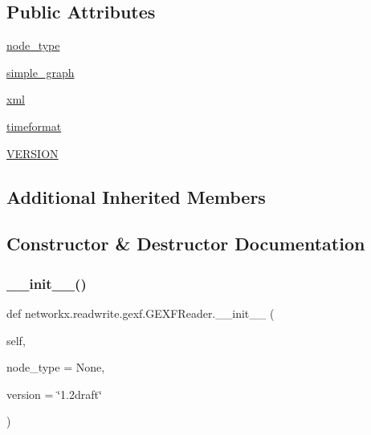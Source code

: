 \subsection*{Public Attributes}
\begin{DoxyCompactItemize}
\item 
\hyperlink{classnetworkx_1_1readwrite_1_1gexf_1_1GEXFReader_ab022efcb044daa1f42b2615cf23d138d}{node\+\_\+type}
\item 
\hyperlink{classnetworkx_1_1readwrite_1_1gexf_1_1GEXFReader_a7c01dd959645523de371d648253c10a1}{simple\+\_\+graph}
\item 
\hyperlink{classnetworkx_1_1readwrite_1_1gexf_1_1GEXFReader_af0364bdce16a7a6b7b7a99ee8fc10c1d}{xml}
\item 
\hyperlink{classnetworkx_1_1readwrite_1_1gexf_1_1GEXFReader_a2cc801b9e5e8dfa61e588269109c3c14}{timeformat}
\item 
\hyperlink{classnetworkx_1_1readwrite_1_1gexf_1_1GEXFReader_af739ebe81cb931658234506dce12d423}{V\+E\+R\+S\+I\+ON}
\end{DoxyCompactItemize}
\subsection*{Additional Inherited Members}


\subsection{Constructor \& Destructor Documentation}
\mbox{\label{classnetworkx_1_1readwrite_1_1gexf_1_1GEXFReader_ad35842c57fecd6a6ea233500e6f1746d}} 
\subsubsection{\texorpdfstring{\+\_\+\+\_\+init\+\_\+\+\_\+()}{\_\_init\_\_()}}
{\footnotesize\ttfamily def networkx.\+readwrite.\+gexf.\+G\+E\+X\+F\+Reader.\+\_\+\+\_\+init\+\_\+\+\_\+ (\begin{DoxyParamCaption}\item[{}]{self,  }\item[{}]{node\+\_\+type = {\ttfamily None},  }\item[{}]{version = {\ttfamily \char`\"{}1.2draft\char`\"{}} }\end{DoxyParamCaption})}



